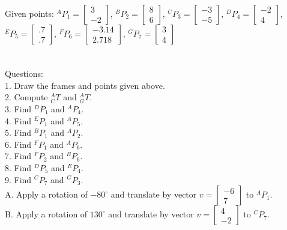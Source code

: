 \documentclass{article}
\begin{document}
Given points: ${}^{A}P_{1}=\begin{bmatrix}
3  \\
-2 
\end{bmatrix}$, ${}^{B}P_{2}=\begin{bmatrix}
8  \\
6 
\end{bmatrix}$, ${}^{C}P_{3}=\begin{bmatrix}
-3  \\
-5 
\end{bmatrix}$, ${}^{D}P_{4}=\begin{bmatrix}
-2  \\
4 
\end{bmatrix}$,${}^{E}P_{5}=\begin{bmatrix}
.7  \\
.7 
\end{bmatrix}$, ${}^{F}P_{6}=\begin{bmatrix}
-3.14  \\
2.718 
\end{bmatrix}$, ${}^{G}P_{7}=\begin{bmatrix}
3  \\
4 
\end{bmatrix}$ \\\\\\
Questions:\\
1. Draw the frames and points given above.\\
2. Compute ${}^{A}_{C}T$ and ${}^{A}_{G}T$. \\
3. Find ${}^{D}P_{1}$ and ${}^{A}P_{4}$. \\
4. Find ${}^{E}P_{1}$ and ${}^{A}P_{5}$. \\
5. Find ${}^{B}P_{1}$ and ${}^{A}P_{2}$.\\
6. Find ${}^{F}P_{1}$ and ${}^{A}P_{6}$. \\
7. Find ${}^{F}P_{2}$ and ${}^{B}P_{6}$. \\
8. Find ${}^{D}P_{5}$ and ${}^{E}P_{4}$. \\
9. Find ${}^{C}P_{7}$ and ${}^{G}P_{3}$. \\
A. Apply a rotation of $-80^\circ$ and translate by vector $v=\begin{bmatrix}
-6  \\
7 
\end{bmatrix}$ to ${}^{A}P_{1}$.\\
B. Apply a rotation of $130^\circ$ and translate by vector $v=\begin{bmatrix}
4  \\
-2 
\end{bmatrix}$ to ${}^{C}P_{7}$.
\newpage
\end{document}
